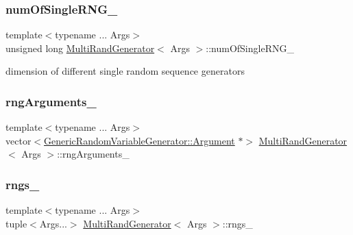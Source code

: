 \subsubsection{\texorpdfstring{num\+Of\+Single\+R\+N\+G\+\_\+}{numOfSingleRNG\_}}
{\footnotesize\ttfamily template$<$typename ... Args$>$ \\
unsigned long \hyperlink{class_multi_rand_generator}{Multi\+Rand\+Generator}$<$ Args $>$\+::num\+Of\+Single\+R\+N\+G\+\_\+\hspace{0.3cm}{\ttfamily [private]}}

dimension of different single random sequence generators \hypertarget{class_multi_rand_generator_a267533dce301acea01978671fa3cb72f}{}\label{class_multi_rand_generator_a267533dce301acea01978671fa3cb72f} 
\subsubsection{\texorpdfstring{rng\+Arguments\+\_\+}{rngArguments\_}}
{\footnotesize\ttfamily template$<$typename ... Args$>$ \\
vector$<$\hyperlink{class_generic_random_variable_generator_1_1_argument}{Generic\+Random\+Variable\+Generator\+::\+Argument} $\ast$$>$ \hyperlink{class_multi_rand_generator}{Multi\+Rand\+Generator}$<$ Args $>$\+::rng\+Arguments\+\_\+\hspace{0.3cm}{\ttfamily [private]}}

\hypertarget{class_multi_rand_generator_a531c3ee630241e7c43b0e3fce70850b1}{}\label{class_multi_rand_generator_a531c3ee630241e7c43b0e3fce70850b1} 
\subsubsection{\texorpdfstring{rngs\+\_\+}{rngs\_}}
{\footnotesize\ttfamily template$<$typename ... Args$>$ \\
tuple$<$Args...$>$ \hyperlink{class_multi_rand_generator}{Multi\+Rand\+Generator}$<$ Args $>$\+::rngs\+\_\+\hspace{0.3cm}{\ttfamily [private]}}

\hypertarget{class_multi_rand_generator_a9a4e23b864633276d73890b770736edd}{}\label{class_multi_rand_generator_a9a4e23b864633276d73890b770736edd} 

